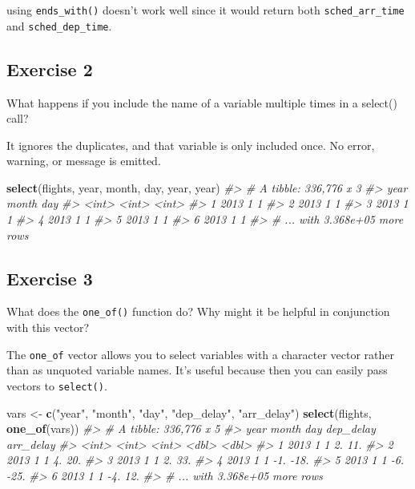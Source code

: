\documentclass[]{book}
\newenvironment{Shaded}{\begin{snugshade}}{\end{snugshade}}
\newcommand{\CommentTok}[1]{\textcolor[rgb]{0.56,0.35,0.01}{\textit{#1}}}
\newcommand{\KeywordTok}[1]{\textcolor[rgb]{0.13,0.29,0.53}{\textbf{#1}}}
\newcommand{\NormalTok}[1]{#1}
\newcommand{\StringTok}[1]{\textcolor[rgb]{0.31,0.60,0.02}{#1}}
\theoremstyle{definition}
\theoremstyle{definition}
\theoremstyle{definition}
\theoremstyle{remark}
\begin{document}
using \texttt{ends\_with()} doesn't work well since it would return both
\texttt{sched\_arr\_time} and \texttt{sched\_dep\_time}.

\hypertarget{exercise-2-3}{%
\subsection{Exercise 2}\label{exercise-2-3}}

What happens if you include the name of a variable multiple times in a
select() call?

It ignores the duplicates, and that variable is only included once. No
error, warning, or message is emitted.

\begin{Shaded}
\begin{Highlighting}[]
\KeywordTok{select}\NormalTok{(flights, year, month, day, year, year)}
\CommentTok{#> # A tibble: 336,776 x 3}
\CommentTok{#>    year month   day}
\CommentTok{#>   <int> <int> <int>}
\CommentTok{#> 1  2013     1     1}
\CommentTok{#> 2  2013     1     1}
\CommentTok{#> 3  2013     1     1}
\CommentTok{#> 4  2013     1     1}
\CommentTok{#> 5  2013     1     1}
\CommentTok{#> 6  2013     1     1}
\CommentTok{#> # ... with 3.368e+05 more rows}
\end{Highlighting}
\end{Shaded}

\hypertarget{exercise-3-3}{%
\subsection{Exercise 3}\label{exercise-3-3}}

What does the \texttt{one\_of()} function do? Why might it be helpful in
conjunction with this vector?

The \texttt{one\_of} vector allows you to select variables with a
character vector rather than as unquoted variable names. It's useful
because then you can easily pass vectors to \texttt{select()}.

\begin{Shaded}
\begin{Highlighting}[]
\NormalTok{vars <-}\StringTok{ }\KeywordTok{c}\NormalTok{(}\StringTok{"year"}\NormalTok{, }\StringTok{"month"}\NormalTok{, }\StringTok{"day"}\NormalTok{, }\StringTok{"dep_delay"}\NormalTok{, }\StringTok{"arr_delay"}\NormalTok{)}
\KeywordTok{select}\NormalTok{(flights, }\KeywordTok{one_of}\NormalTok{(vars))}
\CommentTok{#> # A tibble: 336,776 x 5}
\CommentTok{#>    year month   day dep_delay arr_delay}
\CommentTok{#>   <int> <int> <int>     <dbl>     <dbl>}
\CommentTok{#> 1  2013     1     1        2.       11.}
\CommentTok{#> 2  2013     1     1        4.       20.}
\CommentTok{#> 3  2013     1     1        2.       33.}
\CommentTok{#> 4  2013     1     1       -1.      -18.}
\CommentTok{#> 5  2013     1     1       -6.      -25.}
\CommentTok{#> 6  2013     1     1       -4.       12.}
\CommentTok{#> # ... with 3.368e+05 more rows}
\end{Highlighting}
\end{Shaded}
\end{document}
